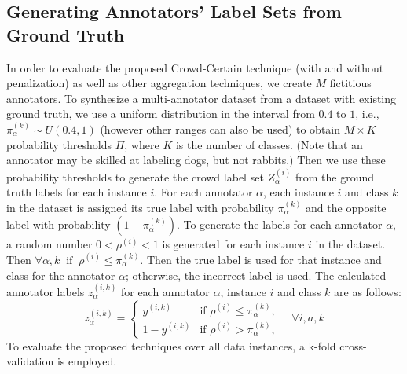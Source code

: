 \subsection{Generating Annotators' Label Sets from Ground Truth}\label{subsec:methods.generating_fictitious_labelset}
In order to evaluate the proposed Crowd-Certain technique (with and without penalization) as well as other aggregation techniques, we create $M$ fictitious annotators. To synthesize a multi-annotator dataset from a dataset with existing ground truth, we use a uniform distribution in the interval from $0.4 $ to $1 $, i.e., $\pi_\alpha^{(k)} \sim U\left(0.4,1\right) $ (however other ranges can also be used) to obtain $M \times  K$ probability thresholds $\Pi $, where $K$ is the number of classes. (Note that
an annotator may be skilled at labeling dogs, but not rabbits.) Then we use these probability thresholds to generate the crowd label set $Z_{\alpha}^{(i)} $ from the ground truth labels for each instance $i $.
For each annotator $\alpha $, each instance $i $ and class $k $ in the dataset is assigned its true label with probability $\pi_\alpha^{(k)}$ and the opposite label with probability $ (1-\pi_\alpha^{(k)})$. To generate the labels for each annotator $\alpha $, a random number $0 < \rho^{(i)} < 1 $ is generated for each instance $i $ in the dataset. Then $\forall \alpha,k \; \; \text{if} \; \; \rho^{(i)}\leq \pi_\alpha^{(k)}$. Then the true label is used for that instance and class for the annotator $\alpha $; otherwise, the incorrect label is used.
The calculated annotator labels $z_{\alpha}^{(i,k)} $ for each annotator $\alpha $, instance $i $ and class $k $ are as follows:
\begin{equation}
    z_{\alpha}^{(i,k)} =
    \begin{cases}
        y^{(i,k)} & \text{if } \rho^{(i)}  \leq \pi_\alpha^{(k)} , \\
        1 - y^{(i,k)} & \text{if } \rho^{(i)} > \pi_\alpha^{(k)} ,
    \end{cases} \quad \forall i, a, k
    \label{eq:crowd.Eq.4.fictitious_label}
\end{equation}
To evaluate the proposed techniques over all data instances, a k-fold cross-validation is employed.

